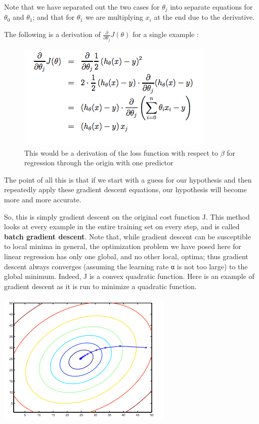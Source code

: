 \documentclass[
]{article}
\begin{document}
Note that we have separated out the two cases for \(\theta_j\) into
separate equations for \(\theta_0\) and \(\theta_1\); and that for
\(\theta_1\) we are multiplying \(x_{i}\) at the end due to the
derivative.

The following is a derivation of
\(\frac {\partial}{\partial \theta_j}J(\theta)\) for a single example :

\begin{figure}
\centering
\includegraphics{Gradient_descent_for_linear_regression_graph_1.png}
\caption{{This would be a derivation of the loss function with respect
to \(\beta\) for regression through the origin with one predictor}}
\end{figure}

The point of all this is that if we start with a guess for our
hypothesis and then repeatedly apply these gradient descent equations,
our hypothesis will become more and more accurate.

So, this is simply gradient descent on the original cost function J.
This method looks at every example in the entire training set on every
step, and is called \textbf{batch gradient descent}. Note that, while
gradient descent can be susceptible to local minima in general, the
optimization problem we have posed here for linear regression has only
one global, and no other local, optima; thus gradient descent always
converges (assuming the learning rate α is not too large) to the global
minimum. Indeed, J is a convex quadratic function. Here is an example of
gradient descent as it is run to minimize a quadratic function.

\includegraphics{Gradient_descent_for_linear_regression_graph_2.png}
\end{document}
